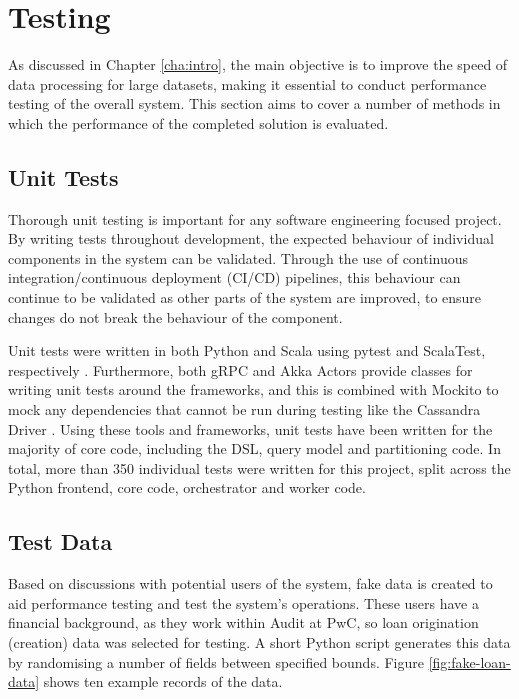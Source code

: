 \chapter{Testing}\label{cha:testing}


As discussed in Chapter \ref{cha:intro}, the main objective is to improve the speed of data processing for large datasets, making it essential to conduct performance testing of the overall system. This section aims to cover a number of methods in which the performance of the completed solution is evaluated.




\section{Unit Tests}
Thorough unit testing is important for any software engineering focused project. By writing tests throughout development, the expected behaviour of individual components in the system can be validated. Through the use of continuous integration/continuous deployment (CI/CD) pipelines, this behaviour can continue to be validated as other parts of the system are improved, to ensure changes do not break the behaviour of the component. 

Unit tests were written in both Python and Scala using pytest and ScalaTest, respectively \cite{pytest, scalatestuserguide}. Furthermore, both gRPC and Akka Actors provide classes for writing unit tests around the frameworks, and this is combined with Mockito to mock any dependencies that cannot be run during testing like the Cassandra Driver \cite{scalatestplusmockito, datastaxjavadriver}. Using these tools and frameworks, unit tests have been written for the majority of core code, including the DSL, query model and partitioning code. In total, more than 350 individual tests were written for this project, split across the Python frontend, core code, orchestrator and worker code.



\section{Test Data}
Based on discussions with potential users of the system, fake data is created to aid performance testing and test the system's operations. These users have a financial background, as they work within Audit at PwC, so loan origination (creation) data was selected for testing. A short Python script generates this data by randomising a number of fields between specified bounds. Figure \ref{fig:fake-loan-data} shows ten example records of the data.

